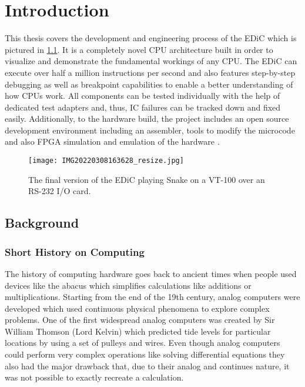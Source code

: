 \chapter{Introduction} \label{cha:intro}
This thesis covers the development and engineering process of the \gls{EDiC} which is pictured in \cref{fig:EDiCSnake}.
It is a completely novel \gls{CPU} architecture built in order to visualize and demonstrate the fundamental workings of any \gls{CPU}.
The \gls{EDiC} can execute over half a million instructions per second and also features step-by-step debugging as well as breakpoint capabilities to enable a better understanding of how \glspl{CPU} work.
All components can be tested individually with the help of dedicated test adapters and, thus, \gls{IC} failures can be tracked down and fixed easily.
Additionally, to the hardware build, the project includes an open source development environment including an assembler, tools to modify the microcode and also \gls{FPGA} simulation and emulation of the hardware \cite{EDiCGitHub}.
\begin{figure}[t]
  \centering
  \texttt{[image: IMG20220308163628\_resize.jpg]}
  \caption{The final version of the \gls{EDiC} playing Snake on a VT-100 over an RS-232 I/O card.}
  \label{fig:EDiCSnake}
\end{figure}
\section{Background}
\subsection{Short History on Computing}
The history of computing hardware goes back to ancient times when people used devices like the abacus which simplifies calculations like additions or multiplications.
Starting from the end of the 19th century, analog computers were developed which used continuous physical phenomena to explore complex problems.
One of the first widespread analog computers was created by Sir William Thomson (Lord Kelvin) which predicted tide levels for particular locations by using a set of pulleys and wires. \cite{sep-computing-history}
Even though analog computers could perform very complex operations like solving differential equations \cite{analogDiff} they also had the major drawback that, due to their analog and continues nature, it was not possible to exactly recreate a calculation.

